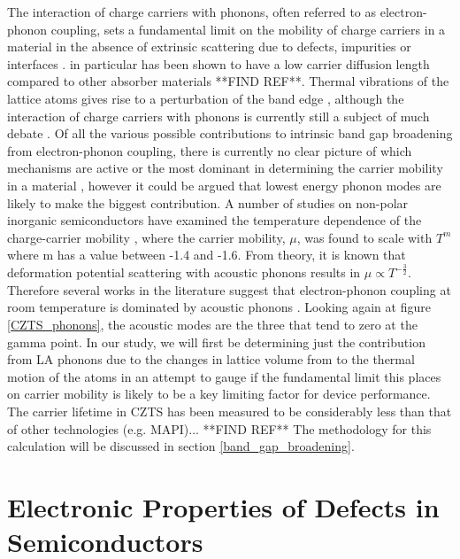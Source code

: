 The interaction of charge carriers with phonons, often referred to as electron-phonon coupling, sets a fundamental limit on the mobility of charge carriers in a material in the absence of extrinsic scattering due to defects, impurities or interfaces \cite{fund_semi, MAPI_Eg_broadening}. 
{\CZTS} in particular has been shown to have a low carrier diffusion length compared to other absorber materials **FIND REF**.
Thermal vibrations of the lattice atoms gives rise to a perturbation of the band edge \cite{thin_film_Boer}, although the interaction of charge carriers with phonons is currently still a subject of much debate \cite{MAPI_Eg_broadening16, MAPI_Eg_broadening17, MAPI_Eg_broadening}.
Of all the various possible contributions to intrinsic band gap broadening from electron-phonon coupling, there is currently no clear picture of which mechanisms are active or the most dominant in determining the carrier mobility in a material \cite{MAPI_Eg_broadening}, however it could be argued that lowest energy phonon modes are likely to make the biggest contribution. A number of studies on non-polar inorganic semiconductors have examined the temperature dependence of the charge-carrier mobility \cite{MAPI_Eg_broadening21, MAPI_Eg_broadening22, MAPI_Eg_broadening23, MAPI_Eg_broadening24}, where the carrier mobility, $\mu$, was found to scale with $T^m$ where m has a value between -1.4 and -1.6. From theory, it is known that deformation potential scattering with acoustic phonons results in $\mu \propto T^{-\frac{3}{2}}$. Therefore several works in the literature suggest that electron-phonon coupling at room temperature is dominated by acoustic phonons \cite{MAPI_Eg_broadening16, MAPI_Eg_broadening17, MAPI_Eg_broadening24}. Looking again at figure \ref{CZTS_phonons}, the acoustic modes are the three that tend to zero at the gamma point.
In our study, we will first be determining just the contribution from LA phonons due to the changes in lattice volume from to the thermal motion of the atoms in an attempt to gauge if the fundamental limit this places on carrier mobility is likely to be a key limiting factor for device performance. The carrier lifetime in CZTS has been measured to be considerably less than that of other technologies (e.g. MAPI)... **FIND REF** The methodology for this calculation will be discussed in section \ref{band_gap_broadening}.
 
\section{Electronic Properties of Defects in Semiconductors}

